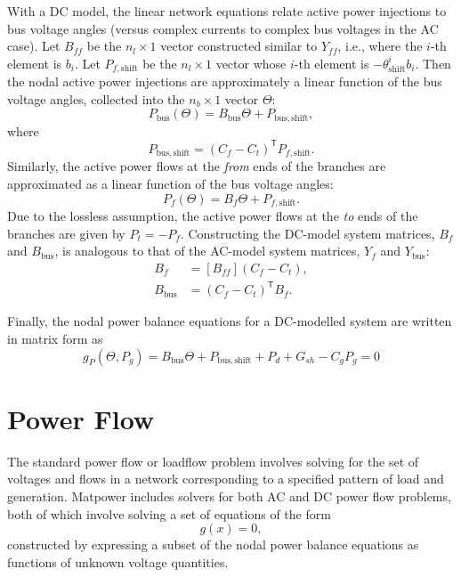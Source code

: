 \documentclass[12pt]{article}
\newcommand{\matpower}[0]{{\sc Matpower}}
\newcommand{\trans}[1]{{#1}^{\ensuremath{\mathsf{T}}}}  %
\newcommand{\diag}[1]{\left[{#1}\right]}                %
\numberwithin{equation}{section}
\numberwithin{table}{section}
\numberwithin{figure}{section}
\begin{document}
With a DC model, the linear network equations relate active power injections to bus voltage angles
(versus complex currents to complex bus voltages in the AC case).
Let $B_{f\!f}$ be the $n_l \times 1$ vector constructed similar to $Y_{f\!f}$,
i.e., where the $i$-th element is $b_i$.
Let $P_{f,\mathrm{shift}}$ be the $n_l \times 1$ vector whose $i$-th element is $- \theta_\mathrm{shift}^i b_i$.
Then the nodal active power injections are approximately a linear function of the bus voltage angles,
collected into the $n_b \times 1$ vector $\Theta$:
\begin{equation}
P_\mathrm{bus}(\Theta) = B_\mathrm{bus} \Theta + P_\mathrm{bus,shift},
\end{equation}
where
\begin{equation}
P_\mathrm{bus,shift} = \trans{(C_f - C_t)} P_{f,\mathrm{shift}}.
\end{equation}
Similarly, the active power flows at the \emph{from} ends of the branches
are approximated as a linear function of the bus voltage angles:
\begin{equation}
P_f(\Theta) = B_f \Theta + P_{f,\mathrm{shift}}.
\label{eq:Pf}
\end{equation}
Due to the lossless assumption, the active power flows at the \emph{to} ends of the branches are given by $P_t = -P_f$.
Constructing the DC-model system matrices,
$B_f$ and $B_\mathrm{bus}$,
is analogous to that of the AC-model system matrices,
$Y_f$ and $Y_\mathrm{bus}$:
\begin{align}
B_f &= \diag{ B_{f\!f} }( C_f - C_t ), \label{eq:Bf} \\
B_\mathrm{bus} &= \trans{( C_f - C_t )} B_f. \label{eq:Bbus}
\end{align}

Finally, the nodal power balance equations for a DC-modelled system are written in matrix form as
\begin{equation}
g_P(\Theta, P_g) = B_\mathrm{bus} \Theta + P_\mathrm{bus,shift} + P_d + G_{sh} - C_g P_g = 0
\label{eq:dcpf}
\end{equation}


\clearpage
\section{Power Flow}
\label{sec:pf}

The standard power flow or loadflow problem involves solving for the set of voltages and flows in a network corresponding to a specified pattern of load and generation. \matpower{} includes solvers for both AC and DC power flow problems, both of which involve solving a set of equations of the form
\begin{equation}
g(x) = 0,	\label{eq:gx0}
\end{equation}
constructed by expressing a subset of the nodal power balance equations as functions of unknown voltage quantities.
\end{document}
